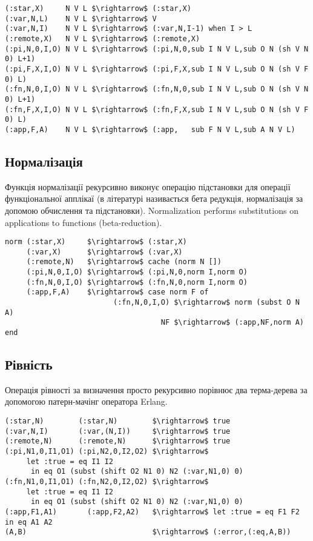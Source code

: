 \documentclass{article}
\begin{document}
\begin{lstlisting}[mathescape=true]
(:star,X)     N V L $\rightarrow$ (:star,X)
(:var,N,L)    N V L $\rightarrow$ V
(:var,N,I)    N V L $\rightarrow$ (:var,N,I-1) when I > L
(:remote,X)   N V L $\rightarrow$ (:remote,X)
(:pi,N,0,I,O) N V L $\rightarrow$ (:pi,N,0,sub I N V L,sub O N (sh V N 0) L+1)
(:pi,F,X,I,O) N V L $\rightarrow$ (:pi,F,X,sub I N V L,sub O N (sh V F 0) L)
(:fn,N,0,I,O) N V L $\rightarrow$ (:fn,N,0,sub I N V L,sub O N (sh V N 0) L+1)
(:fn,F,X,I,O) N V L $\rightarrow$ (:fn,F,X,sub I N V L,sub O N (sh V F 0) L)
(:app,F,A)    N V L $\rightarrow$ (:app,   sub F N V L,sub A N V L)
\end{lstlisting}

\subsection{Нормалізація}
Функція нормалізації рекурсивно виконує операцію підстановки для операції функціональної апплікаї
(в літературі називається бета редукція, нормалізація за допомою обчислення та підстановки).
Normalization performs substitutions on applications to functions (beta-reduction).

\begin{lstlisting}[mathescape=true]
norm (:star,X)     $\rightarrow$ (:star,X)
     (:var,X)      $\rightarrow$ (:var,X)
     (:remote,N)   $\rightarrow$ cache (norm N [])
     (:pi,N,0,I,O) $\rightarrow$ (:pi,N,0,norm I,norm O)
     (:fn,N,0,I,O) $\rightarrow$ (:fn,N,0,norm I,norm O)
     (:app,F,A)    $\rightarrow$ case norm F of
                         (:fn,N,0,I,O) $\rightarrow$ norm (subst O N A)
                                    NF $\rightarrow$ (:app,NF,norm A) end
\end{lstlisting}

\subsection{Рівність}

Операція рівності за визначення просто рекурсивно порівнює два терма-дерева за допомогою патерн-мачінг оператора Erlang.

\begin{lstlisting}[mathescape=true]
(:star,N)        (:star,N)        $\rightarrow$ true
(:var,N,I)       (:var,(N,I))     $\rightarrow$ true
(:remote,N)      (:remote,N)      $\rightarrow$ true
(:pi,N1,0,I1,O1) (:pi,N2,0,I2,O2) $\rightarrow$
     let :true = eq I1 I2
      in eq O1 (subst (shift O2 N1 0) N2 (:var,N1,0) 0)
(:fn,N1,0,I1,O1) (:fn,N2,0,I2,O2) $\rightarrow$
     let :true = eq I1 I2
      in eq O1 (subst (shift O2 N1 0) N2 (:var,N1,0) 0)
(:app,F1,A1)       (:app,F2,A2)   $\rightarrow$ let :true = eq F1 F2 in eq A1 A2
(A,B)                             $\rightarrow$ (:error,(:eq,A,B))
\end{lstlisting}
\end{document}
